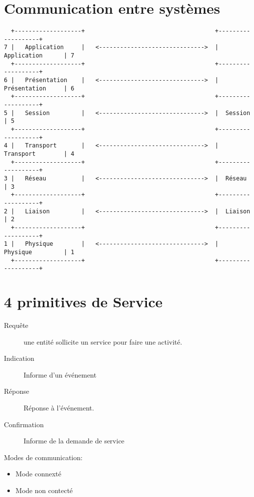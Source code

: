 \documentclass[12pt,a4paper,openany]{book}
\begin{document}
\section{Communication entre systèmes}
\begin{verbatim}
  +-------------------+                                     +-------------------+
7 |   Application     |   <------------------------------>  |  Application      | 7
  +-------------------+                                     +-------------------+
6 |   Présentation    |   <------------------------------>  |  Présentation     | 6 
  +-------------------+                                     +-------------------+
5 |   Session         |   <------------------------------>  |  Session          | 5 
  +-------------------+                                     +-------------------+
4 |   Transport       |   <------------------------------>  |  Transport        | 4
  +-------------------+                                     +-------------------+
3 |   Réseau          |   <------------------------------>  |  Réseau           | 3
  +-------------------+                                     +-------------------+ 
2 |   Liaison         |   <------------------------------>  |  Liaison          | 2
  +-------------------+                                     +-------------------+
1 |   Physique        |   <------------------------------>  |  Physique         | 1
  +-------------------+                                     +-------------------+

\end{verbatim}

\section{4 primitives de Service} 
\begin{description}
	\item[Requête] une entité sollicite un service pour faire une activité.
	\item[Indication] Informe d'un événement
	\item[Réponse] Réponse à l'événement.
	\item[Confirmation] Informe de la demande de service
\end{description}
Modes de communication:
\begin{itemize}
	\item Mode connexté
	\item Mode non contecté
\end{itemize}
\end{document}
